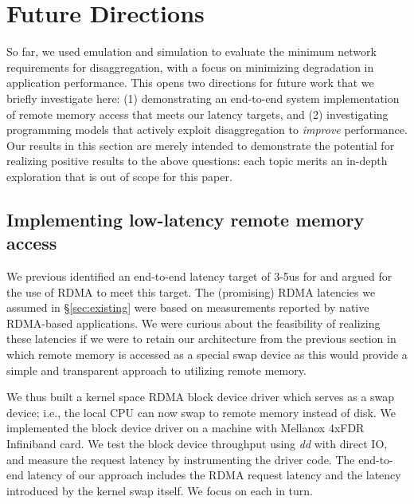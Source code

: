 \vspace{-0.1in}
\section{Future Directions}
\label{sec:future}
\vspace{-0.05in}

So far, we used emulation and simulation to evaluate the minimum network requirements for disaggregation, with a focus on minimizing degradation in application performance. 
This opens two directions for future work that we briefly investigate here: (1) demonstrating an end-to-end system implementation of remote memory access that meets our latency targets, and (2) investigating programming models that actively exploit disaggregation to \emph{improve} performance.
Our results in this section are merely intended to demonstrate the potential for realizing positive results to the above questions: each topic merits an in-depth exploration that is out of scope for this paper.


\vspace{-0.1in}
\subsection{Implementing low-latency remote memory access}
\vspace{-0.05in}
We previous identified an end-to-end latency target of 3-5us for \dis and argued for the use of  RDMA to meet this target. The (promising) RDMA latencies we assumed in \S\ref{sec:existing} were based on measurements reported by native RDMA-based applications. 
We were curious about the feasibility of realizing these latencies if we were to retain our 
architecture from the previous section in which remote memory is accessed as a special swap device as this would provide a simple and transparent approach to utilizing remote memory. 

We thus built a kernel space RDMA block device driver which serves as a swap device; i.e., the local CPU can now swap to remote memory instead of disk.
We implemented the block device driver on a machine with Mellanox  4xFDR Infiniband card.
We test the block device throughput using \textit{dd} with direct IO, and measure the request latency by instrumenting the driver code. 
The end-to-end latency of our approach includes the RDMA request latency and the latency introduced by the kernel swap itself. We focus on each in turn. 

